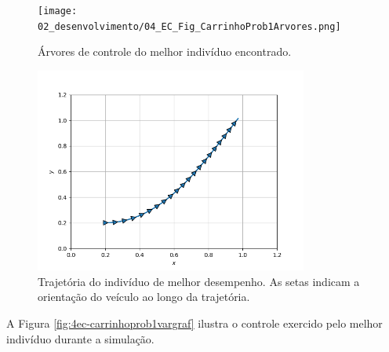 \begin{figure}[H]
	\centering
	\texttt{[image: 02\_desenvolvimento/04\_EC\_Fig\_CarrinhoProb1Arvores.png]}
	\caption{Árvores de controle do melhor indivíduo encontrado.}
	\label{fig:4ec-carrinhoprob1arvore}
\end{figure}


\begin{figure}[H]
	\centering
	\includegraphics[width=0.8\textwidth]{02_desenvolvimento/04_EC_Fig_CarrinhoProb1TrajGraf.png}
	\caption{Trajetória do indivíduo de melhor desempenho. As setas indicam a orientação do veículo ao longo da trajetória.}
	\label{fig:4ec-carrinhoprob1trajgraf}
\end{figure}


A Figura \ref{fig:4ec-carrinhoprob1vargraf} ilustra o controle exercido pelo melhor indivíduo durante a simulação.

